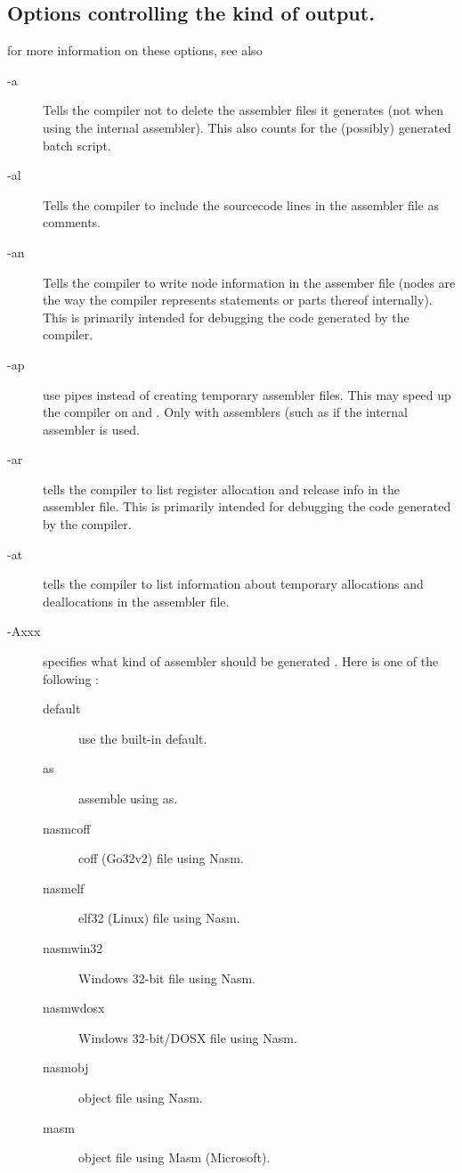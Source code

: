 \subsection{Options controlling the kind of output.}
\label{se:codegen}
for more information on these options, see also \progref
\begin{description}
\item [-a]  Tells the compiler not to delete the assembler files
it generates (not when using the internal assembler).
This also counts for the (possibly) generated batch script.
\item [-al]  Tells the compiler to include the sourcecode lines
in the assembler file as comments.
\item[-an]  Tells the compiler to write node information in the
assember file (nodes are the way the compiler represents statements or parts
thereof internally). This is primarily intended for debugging
the code generated by the compiler.
\item[-ap]  use pipes instead of creating temporary assembler
files.  This may speed up the compiler on \ostwo and \linux. 
Only with assemblers (such as \gnu %
if the internal assembler is used.
\item[-ar]  tells the compiler to list register allocation and
release info in the assembler file. This is primarily intended for debugging
the code generated by the compiler.
\item[-at]  tells the compiler to list information about
temporary allocations and deallocations in the assembler file.
\item [-Axxx]  specifies what kind of assembler should be generated . Here
 is one of the following :
\begin{description}
\item[default] use the built-in default.
\item[as] assemble using \gnu as.
\item[nasmcoff] coff (Go32v2) file using Nasm.
\item[nasmelf] elf32 (Linux) file using Nasm.
\item[nasmwin32] Windows 32-bit file using Nasm.
\item[nasmwdosx] Windows 32-bit/DOSX file using Nasm.
\item[nasmobj] object file using Nasm.
\item[masm] object file using Masm (Microsoft).

\end{description}
\end{description}
